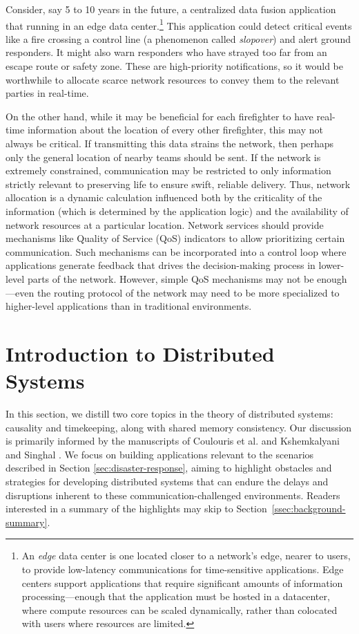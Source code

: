 \documentclass[]             %
{NASA}                       %
\theoremstyle{definition}
\begin{document}
Consider, say 5 to 10 years in the future, a centralized data fusion
application that running in an edge data center.\footnote{An
  \emph{edge} data center is one located closer to a network's edge,
  nearer to users, to provide low-latency communications for
  time-sensitive applications. Edge centers support applications that
  require significant amounts of information processing---enough that
  the application must be hosted in a datacenter, where compute
  resources can be scaled dynamically, rather than colocated with
  users where resources are limited.} This application could detect
critical events like a fire crossing a control line (a phenomenon
called \emph{slopover}) and alert ground responders. It might also
warn responders who have strayed too far from an escape route or
safety zone. These are high-priority notifications, so it would be
worthwhile to allocate scarce network resources to convey them to the
relevant parties in real-time.

On the other hand, while it may be beneficial for each firefighter to
have real-time information about the location of every other
firefighter, this may not always be critical. If transmitting this
data strains the network, then perhaps only the general location of
nearby teams should be sent. If the network is extremely constrained,
communication may be restricted to only information strictly relevant
to preserving life to ensure swift, reliable delivery. Thus, network
allocation is a dynamic calculation influenced both by the criticality
of the information (which is determined by the application logic) and
the availability of network resources at a particular
location. Network services should provide mechanisms like Quality of
Service (QoS) indicators to allow prioritizing certain
communication. Such mechanisms can be incorporated into a control loop
where applications generate feedback that drives the decision-making
process in lower-level parts of the network. However, simple QoS
mechanisms may not be enough---even the routing protocol of the
network may need to be more specialized to higher-level applications
than in traditional environments.


\section{Introduction to Distributed Systems}
\label{sec:background}
In this section, we distill two core topics in the theory of
distributed systems: causality and timekeeping, along with shared
memory consistency.  Our discussion is primarily informed by the
manuscripts of Coulouris et al.  \cite{coulouris2005distributed} and
Kshemkalyani and Singhal \cite{kshemkalyani_singhal_2008}. We focus on
building applications relevant to the scenarios described in Section
\ref{sec:disaster-response}, aiming to highlight obstacles and
strategies for developing distributed systems that can endure the
delays and disruptions inherent to these communication-challenged
environments. Readers interested in a summary of the highlights may
skip to Section~\ref{ssec:background-summary}.
\end{document}
